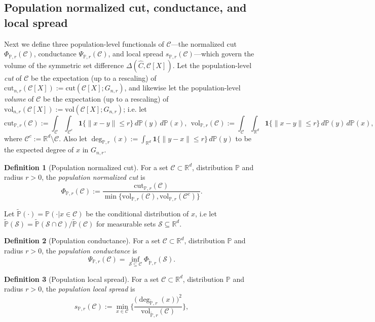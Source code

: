 \documentclass[11pt,twoside]{article}
\theoremstyle{definition}
\newtheorem{definition}{Definition}
\newcommand{\Reals}{\mathbb{R}}
\newcommand{\1}{\mathbf{1}}
\newcommand{\Rd}{\Reals^d}
\newcommand{\mc}[1]{\mathcal{#1}}
\newcommand{\mbb}[1]{\mathbb{#1}}
\newcommand{\Pbb}{\mathbb{P}}
\newcommand{\wt}[1]{\widetilde{#1}}
\newcommand{\wh}[1]{\widehat{#1}}
\newcommand{\vol}{\mathrm{vol}}
\newcommand{\cut}{\mathrm{cut}}
\begin{document}
\subsection{Population normalized cut, conductance, and local spread}
Next we define three population-level functionals of $\mc{C}$---the normalized cut $\Phi_{\Pbb,r}(\mc{C})$, conductance $\Psi_{\Pbb,r}(\mc{C})$, and local spread $s_{\Pbb,r}(\mc{C})$---which govern the volume of the symmetric set difference $\Delta(\wh{C},\mc{C}[X])$. Let the population-level \emph{cut} of $\mc{C}$ be the expectation (up to a rescaling) of $\cut_{n,r}(\mc{C}[X]) := \cut(\mc{C}[X]; G_{n,r})$,  and likewise let the population-level \emph{volume} of $\mc{C}$ be the expectation (up to a rescaling) of $\vol_{n,r}(\mc{C}[X]) := \vol(\mc{C}[X]; G_{n,r})$; i.e. let
\begin{equation*}
\mathrm{cut}_{\Pbb,r}(\mc{C}) := \int_{\mc{C}} \int_{\mc{C}^c} \1\{\|x - y\| \leq r\} \,d\Pbb(y) \,d\Pbb(x),~~ \mathrm{vol}_{\Pbb,r}(\mc{C}) := \int_{\mc{C}} \int_{\Rd} \1\{\|x - y\| \leq r\} \,d\Pbb(y) \,d\Pbb(x),
\end{equation*}
where $\mc{C}^c := \Rd \!\setminus\! \mc{C}$. Also let $\deg_{\Pbb,r}(x) := \int_{\Rd} \1\{\|y - x\| \leq r\} \,d\Pbb(y)$ to be the expected degree of $x$ in $G_{n,r}$. 
\begin{definition}[Population normalized cut]
	For a set $\mc{C} \subset \Rd$, distribution $\Pbb$ and radius $r > 0$, the \emph{population normalized cut} is
	\begin{equation}
	\label{eqn:population_normalized_cut}
	\Phi_{\Pbb,r}(\mc{C}) := \frac{\mathrm{cut}_{\Pbb,r}(\mc{C})}{\min\{\mathrm{vol}_{\Pbb,r}(\mc{C}), \mathrm{vol}_{\Pbb,r}(\mc{C}^c)\}}.
	\end{equation}
\end{definition}

Let $\wt{\mathbb{P}}(\cdot) = \mathbb{P}(\cdot|x \in \mc{C})$ be the conditional distribution of $x$, i.e let $\wt{\mbb{P}}(\mc{S}) = \wt{\Pbb}(\mc{S} \cap \mc{C})/\wt{\Pbb}(\mc{C})$ for measurable sets $\mc{S} \subseteq \Rd$.

\begin{definition}[Population conductance]
	For a set $\mc{C} \subset \Rd$, distribution $\Pbb$ and radius $r > 0$, the \emph{population conductance} is
	\begin{equation}
	\label{eqn:population_conductance}
	\Psi_{\mathbb{P},r}(\mc{C}) = \inf_{\mc{S} \subseteq \mc{C}} \Phi_{\wt{\Pbb},r}(\mc{S}).
	\end{equation}
\end{definition}
\begin{definition}[Population local spread]
	For a set $\mc{C} \subset \Rd$, distribution $\Pbb$ and radius $r > 0$, the \emph{population local spread} is
	\begin{equation}
	\label{eqn:local_spread}
	s_{\Pbb,r}(\mc{C}) := \min_{x \in \mc{C}} \biggl\{\frac{\bigl(\deg_{\wt{\Pbb},r}(x)\bigr)^2}{\vol_{\wt{\Pbb},r}(\mc{C})} \biggr\},
	\end{equation}
\end{definition}
\end{document}

